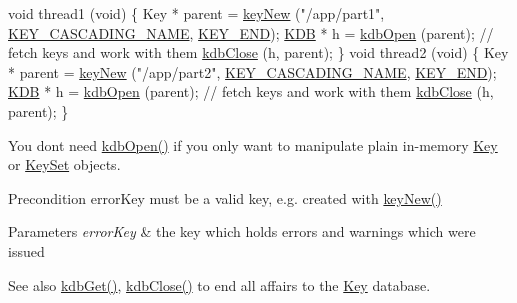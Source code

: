 \begin{DoxyCodeInclude}
\textcolor{keywordtype}{void} thread1 (\textcolor{keywordtype}{void})
\{
        Key * parent = \hyperlink{group__key_gad23c65b44bf48d773759e1f9a4d43b89}{keyNew} (\textcolor{stringliteral}{"/app/part1"}, \hyperlink{group__key_gga9b703ca49f48b482def322b77d3e6bc8afc1567f74444ff9c219f7456b652b4ec}{KEY\_CASCADING\_NAME}, 
      \hyperlink{group__key_gga9b703ca49f48b482def322b77d3e6bc8aa8adb6fcb92dec58fb19410eacfdd403}{KEY\_END});
        \hyperlink{classkdb_1_1KDB_a7e0637995ce9f294cdbc6f167df6db40}{KDB} * h = \hyperlink{group__kdb_ga6808defe5870f328dd17910aacbdc6ca}{kdbOpen} (parent);
        \textcolor{comment}{// fetch keys and work with them}
        \hyperlink{group__kdb_gadb54dc9fda17ee07deb9444df745c96f}{kdbClose} (h, parent);
\}
\textcolor{keywordtype}{void} thread2 (\textcolor{keywordtype}{void})
\{
        Key * parent = \hyperlink{group__key_gad23c65b44bf48d773759e1f9a4d43b89}{keyNew} (\textcolor{stringliteral}{"/app/part2"}, \hyperlink{group__key_gga9b703ca49f48b482def322b77d3e6bc8afc1567f74444ff9c219f7456b652b4ec}{KEY\_CASCADING\_NAME}, 
      \hyperlink{group__key_gga9b703ca49f48b482def322b77d3e6bc8aa8adb6fcb92dec58fb19410eacfdd403}{KEY\_END});
        \hyperlink{classkdb_1_1KDB_a7e0637995ce9f294cdbc6f167df6db40}{KDB} * h = \hyperlink{group__kdb_ga6808defe5870f328dd17910aacbdc6ca}{kdbOpen} (parent);
        \textcolor{comment}{// fetch keys and work with them}
        \hyperlink{group__kdb_gadb54dc9fda17ee07deb9444df745c96f}{kdbClose} (h, parent);
\}
\end{DoxyCodeInclude}
 You don\textquotesingle{}t need \hyperlink{group__kdb_ga6808defe5870f328dd17910aacbdc6ca}{kdb\+Open()} if you only want to manipulate plain in-\/memory \hyperlink{classkdb_1_1Key}{Key} or \hyperlink{classkdb_1_1KeySet}{Key\+Set} objects.

\begin{DoxyPrecond}{Precondition}
error\+Key must be a valid key, e.\+g. created with \hyperlink{group__key_gad23c65b44bf48d773759e1f9a4d43b89}{key\+New()}
\end{DoxyPrecond}

\begin{DoxyParams}{Parameters}
{\em error\+Key} & the key which holds errors and warnings which were issued \\
\hline
\end{DoxyParams}
\begin{DoxySeeAlso}{See also}
\hyperlink{group__kdb_ga28e385fd9cb7ccfe0b2f1ed2f62453a1}{kdb\+Get()}, \hyperlink{group__kdb_gadb54dc9fda17ee07deb9444df745c96f}{kdb\+Close()} to end all affairs to the \hyperlink{group__key}{Key} database. 
\end{DoxySeeAlso}

